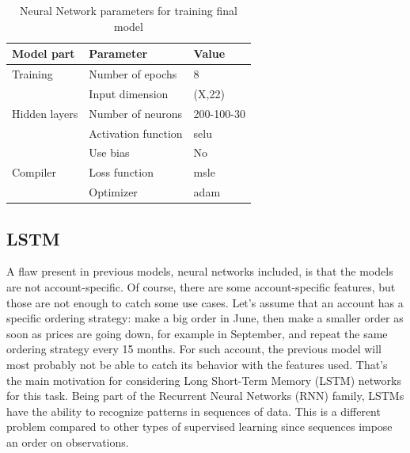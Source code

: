 \begin{table}[b]
    \centering
    \begin{tabular}{l|l|l}
        \textbf{Model part}           & \textbf{Parameter}                 & \textbf{Value}         \\ \hline
        Training                      & Number of epochs                   & 8                     \\
                                      & Input dimension                    & (X,22)                     \\ \hline
        Hidden layers                 & Number of neurons                  & 200-100-30                     \\
                                      & Activation function                & selu                     \\
                                      & Use bias                           & No                     \\ \hline
        \multicolumn{1}{l|}{Compiler} & \multicolumn{1}{l|}{Loss function} & \multicolumn{1}{l}{msle} \\
        \multicolumn{1}{l|}{}         & \multicolumn{1}{l|}{Optimizer}     & \multicolumn{1}{l}{adam}
    \end{tabular}
    \caption{Neural Network parameters for training final model}
    \label{tab:nn-final-parameters}
\end{table}


\subsection{LSTM}
A flaw present in previous models, neural networks included, is that the models are not account-specific. Of course, there are some account-specific features, but those are not enough to catch some use cases. Let's assume that an account has a specific ordering strategy: make a big order in June, then make a smaller order as soon as prices are going down, for example in September, and repeat the same ordering strategy every 15 months. For such account, the previous model will most probably not be able to catch its behavior with the features used. That's the main motivation for considering Long Short-Term Memory (LSTM) networks for this task. Being part of the Recurrent Neural Networks (RNN) family, LSTMs have the ability to recognize patterns in sequences of data. This is a different problem compared to other types of supervised learning since sequences impose an order on observations.

